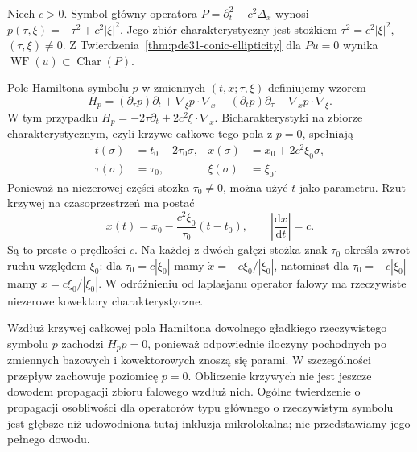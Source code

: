 \begin{przyklad}
\label{ex:pde31-wave-bicharacteristics}
Niech $c>0$. Symbol główny operatora
$P=\partial_t^2-c^2\Delta_x$ wynosi
$p(\tau,\xi)=-\tau^2+c^2|\xi|^2$.
Jego zbiór charakterystyczny jest stożkiem
$\tau^2=c^2|\xi|^2$, $(\tau,\xi)\ne0$.
Z Twierdzenia~\ref{thm:pde31-conic-ellipticity}
dla $Pu=0$ wynika
$\operatorname{WF}(u)\subset\operatorname{Char}(P)$.

Pole Hamiltona symbolu $p$ w zmiennych
$(t,x;\tau,\xi)$ definiujemy wzorem
\[
 H_p=(\partial_\tau p)\partial_t+
 \nabla_\xi p\cdot\nabla_x
 -(\partial_t p)\partial_\tau-\nabla_xp\cdot\nabla_\xi.
\]
W tym przypadku $H_p=-2\tau\partial_t+
2c^2\xi\cdot\nabla_x$. Bicharakterystyki
na zbiorze charakterystycznym, czyli krzywe
całkowe tego pola z $p=0$, spełniają
\[
 \begin{aligned}
 t(\sigma)&=t_0-2\tau_0\sigma,&
 x(\sigma)&=x_0+2c^2\xi_0\sigma,\\
 \tau(\sigma)&=\tau_0,&
 \xi(\sigma)&=\xi_0.
 \end{aligned}
\]
Ponieważ na niezerowej części stożka
$\tau_0\ne0$, można użyć $t$ jako parametru.
Rzut krzywej na czasoprzestrzeń ma postać
\[
 x(t)=x_0-\frac{c^2\xi_0}{\tau_0}(t-t_0),
 \qquad \left|\frac{\mathrm dx}{\mathrm dt}\right|=c .
\]
Są to proste o prędkości $c$.
Na każdej z dwóch gałęzi stożka znak $\tau_0$
określa zwrot ruchu względem $\xi_0$:
dla $\tau_0=c|\xi_0|$ mamy
$\dot x=-c\xi_0/|\xi_0|$, natomiast dla
$\tau_0=-c|\xi_0|$ mamy $\dot x=c\xi_0/|\xi_0|$.
W odróżnieniu od laplasjanu operator falowy
ma rzeczywiste niezerowe kowektory charakterystyczne.

Wzdłuż krzywej całkowej pola Hamiltona dowolnego
gładkiego rzeczywistego symbolu $p$ zachodzi
$H_pp=0$, ponieważ odpowiednie iloczyny
pochodnych po zmiennych bazowych i kowektorowych
znoszą się parami. W szczególności przepływ
zachowuje poziomicę $p=0$.
Obliczenie krzywych nie jest jeszcze dowodem
propagacji zbioru falowego wzdłuż nich.
Ogólne twierdzenie o propagacji osobliwości
dla operatorów typu głównego o rzeczywistym symbolu
jest głębsze niż udowodniona tutaj inkluzja
mikrolokalna; nie przedstawiamy jego pełnego dowodu.
\end{przyklad}

